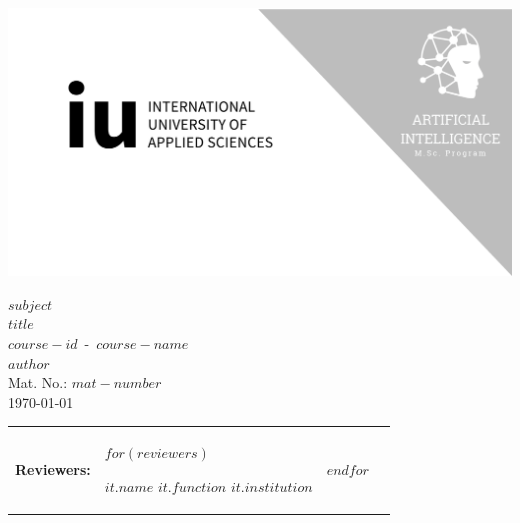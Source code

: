 
\thispagestyle{empty}

\centerline{\includegraphics[width=\paperwidth]{template/img/cover-image.png}}

\vspace{8.5em}

{\Large $subject$}\\
{\Huge $title$}\\
{\LARGE $course-id$\ -\ $course-name$}\\
{\LARGE $author$}\\
{\Large Mat. No.: $mat-number$}\\
{\Large \germandatetime\today}

\vspace*{\fill}

\begin{tabular}{p{0.9in} p{1.5in} p{1.5in} p{1.5in}}
    \textbf{Reviewers:} &
    $for(reviewers)$
        \vspace*{-6.7mm}
        \begin{flushleft}
        $it.name$ \break{}
        $it.function$ \break{}
        $it.institution$
        \end{flushleft} &
    $endfor$

\end{tabular}


\restoregeometry{}
\clearpage
